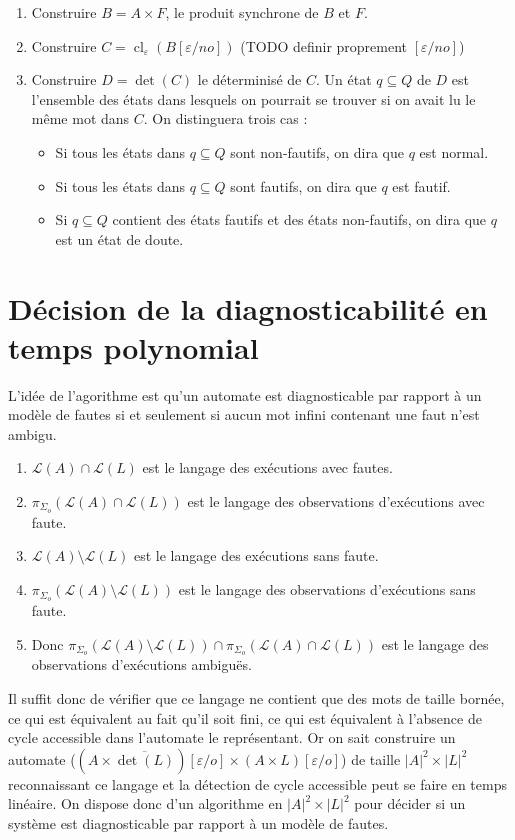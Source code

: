 \documentclass[10pt,a4paper]{article}
\begin{document}
\begin{enumerate}
  \item Construire $B=A\times F$, le produit synchrone de $B$ et $F$.
  \item Construire $C=\operatorname{cl}_\varepsilon(B[\varepsilon/no])$ (TODO definir proprement $[\varepsilon/no]$)
  \item Construire $D=\det(C)$ le d\'eterminis\'e de $C$. Un \'etat $q\subseteq Q$ de $D$ est l'ensemble des \'etats dans lesquels on pourrait se trouver si on avait lu le m\^eme mot dans $C$. On distinguera trois cas :
  \begin{itemize}
    \item Si tous les \'etats dans $q\subseteq Q$ sont non-fautifs, on dira que $q$ est normal.
    \item Si tous les \'etats dans $q\subseteq Q$ sont fautifs, on dira que $q$ est fautif.
    \item Si $q\subseteq Q$ contient des \'etats fautifs et des \'etats non-fautifs, on dira que $q$ est un \'etat de doute.
  \end{itemize}
\end{enumerate} 
     

\section{D\'ecision de la diagnosticabilit\'e en temps polynomial}

L'id\'ee de l'agorithme est qu'un automate est diagnosticable par rapport \`a un mod\`ele de fautes si et seulement si aucun mot infini contenant une faut n'est ambigu.

\begin{enumerate} 
  \item $\mathcal L (A) \cap \mathcal L(L)$ est le langage des ex\'ecutions avec fautes.
  \item $\pi_{\Sigma_o}(\mathcal L (A) \cap \mathcal L(L))$ est le langage des observations d'ex\'ecutions avec faute.
  \item $\mathcal L(A) \setminus \mathcal L(L)$ est le langage des ex\'ecutions sans faute.
  \item $\pi_{\Sigma_o}(\mathcal L(A) \setminus \mathcal L(L))$ est le langage des observations d'ex\'ecutions sans faute.
  \item Donc $\pi_{\Sigma_o}(\mathcal L(A) \setminus \mathcal L(L)) \cap \pi_{\Sigma_o}(\mathcal L (A) \cap \mathcal L(L))$ est le langage des observations d'ex\'ecutions ambiguës.
\end{enumerate}
Il suffit donc de v\'erifier que ce langage ne contient que des mots de taille born\'ee, ce qui est équivalent au fait qu'il soit fini, ce qui est \'equivalent \`a l'absence de cycle accessible dans l'automate le repr\'esentant. Or on sait construire un automate ($(A\times \overline{\det(L)})[\varepsilon/o] \times (A\times L)[\varepsilon/o]$) de taille $|A|^2 \times |L|^2$ reconnaissant ce langage et la d\'etection de cycle accessible peut se faire en temps lin\'eaire. On dispose donc d'un algorithme en $|A|^2 \times |L|^2$ pour d\'ecider si un syst\`eme est diagnosticable par rapport \`a un mod\`ele de fautes.
\end{document}
